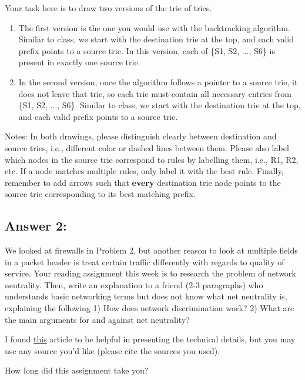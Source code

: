 \documentclass[10pt]{article}
\newenvironment{problem}[2][Problem]{\begin{trivlist}
\item[\hskip \labelsep {\bfseries #1}\hskip \labelsep {\bfseries #2.}]}{\end{trivlist}}
\begin{document}
\begin{problem}{2: Building a Firewall}
\begin{enumerate}
Your task here is to draw two versions of the trie of tries. 
\begin{enumerate}
    \item The first version is the one you would use with the backtracking algorithm. Similar to class, we start with the destination trie at the top, and each valid prefix points to a source trie. In this version, each of \{S1, S2, ..., S6\} is present in exactly one source trie.
    \item In the second version, once the algorithm follows a pointer to a source trie, it does not leave that trie, so each trie must contain all necessary entries from \{S1, S2, ..., S6\}. Similar to class, we start with the destination trie at the top, and each valid prefix points to a source trie. 
\end{enumerate}
Notes: In both drawings, please distinguish clearly between destination and source tries, i.e., different color or dashed lines between them. Please also label which nodes in the source trie correspond to rules by labelling them, i.e., R1, R2, etc. If a node matches multiple rules, only label it with the best rule. Finally, remember to add arrows such that \textbf{every} destination trie node points to the source trie corresponding to its best matching prefix.
\end{enumerate}
\end{problem}

\subsection*{Answer 2:}


\begin{problem}{3: Reading}
We looked at firewalls in Problem 2, but another reason to look at multiple fields in a packet header is treat certain traffic differently with regards to quality of service. Your reading assignment this week is to research the problem of network neutrality. Then, write an explanation to a friend (2-3 paragraphs) who understands basic networking terms but does not know what net neutrality is, explaining the following 1) How does network discrimination work? 2) What are the main arguments for and against net neutrality?

I found \href{https://www.cs.princeton.edu/courses/archive/fall21/cos109/neutrality.pdf}{this} article to be helpful in presenting the technical details, but you may use any source you'd like (please cite the sources you used).
\end{problem}
\begin{problem}{4}
How long did this assignment take you?
\end{problem}
\end{document}
